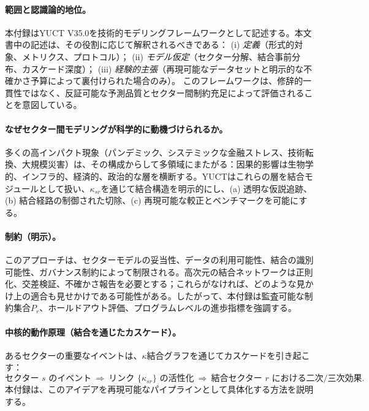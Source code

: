 \documentclass[13pt,a4paper]{ltjsarticle}
\begin{document}
	\paragraph{範囲と認識論的地位。}
	本付録はYUCT V35.0を技術的モデリングフレームワークとして記述する。本文書中の記述は、その役割に応じて解釈されるべきである：
	(i) \emph{定義}（形式的対象、メトリクス、プロトコル）；
	(ii) \emph{モデル仮定}（セクター分解、結合事前分布、カスケード深度）；
	(iii) \emph{経験的主張}（再現可能なデータセットと明示的な不確かさ予算によって裏付けられた場合のみ）。
	このフレームワークは、修辞的一貫性ではなく、反証可能な予測品質とセクター間制約充足によって評価されることを意図している。
	
	\paragraph{なぜセクター間モデリングが科学的に動機づけられるか。}
	多くの高インパクト現象（パンデミック、システミックな金融ストレス、技術転換、大規模災害）は、その構成からして多領域にまたがる：因果的影響は生物学的、インフラ的、経済的、政治的な層を横断する。YUCTはこれらの層を結合モジュールとして扱い、$\kappa_{sr}$を通じて結合構造を明示的にし、(a) 透明な仮説追跡、(b) 結合経路の制御された切除、(c) 再現可能な較正とベンチマークを可能にする。
	
	\paragraph{制約（明示）。}
	このアプローチは、セクターモデルの妥当性、データの利用可能性、結合の識別可能性、ガバナンス制約によって制限される。高次元の結合ネットワークは正則化、交差検証、不確かさ報告を必要とする；これらがなければ、どのような見かけ上の適合も見せかけである可能性がある。したがって、本付録は監査可能な制約集合$P_r$、ホールドアウト評価、プログラムレベルの進歩指標を強調する。
	
	\paragraph{中核的動作原理（結合を通じたカスケード）。}
	あるセクターの重要なイベントは、$\kappa$結合グラフを通じてカスケードを引き起こす：
	\[
	\text{セクター }s \text{ のイベント} \ \Rightarrow\ \text{リンク }\{\kappa_{sr}\}\text{ の活性化}\ \Rightarrow\ \text{結合セクター }r\text{ における二次/三次効果}.
	\]
	本付録は、このアイデアを再現可能なパイプラインとして具体化する方法を説明する。
	
\end{document}

